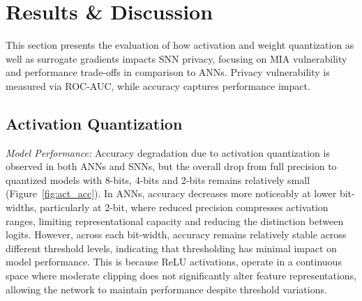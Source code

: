 \section{Results \& Discussion}
\noindent
This section presents the evaluation of how activation and weight quantization as well as surrogate gradients impacts SNN privacy, focusing on MIA vulnerability and performance trade-offs in comparison to ANNs. Privacy vulnerability is measured via ROC-AUC, while accuracy captures performance impact.



\subsection{Activation Quantization}

\noindent

\noindent
\textit{Model Performance:} 
Accuracy degradation due to activation quantization is observed in both ANNs and SNNs, but the overall drop from full precision to quantized models with 8-bits, 4-bits and 2-bits remains relatively small (Figure~\ref{fig:act_acc}). In ANNs, accuracy decreases more noticeably at lower bit-widths, particularly at 2-bit, where reduced precision compresses activation ranges, limiting representational capacity and reducing the distinction between logits. However, across each bit-width, accuracy remains relatively stable across different threshold levels, indicating that thresholding has minimal impact on model performance. This is because  ReLU activations, operate in a continuous space where moderate clipping does not significantly alter feature representations, allowing the network to maintain performance despite threshold variations. 

